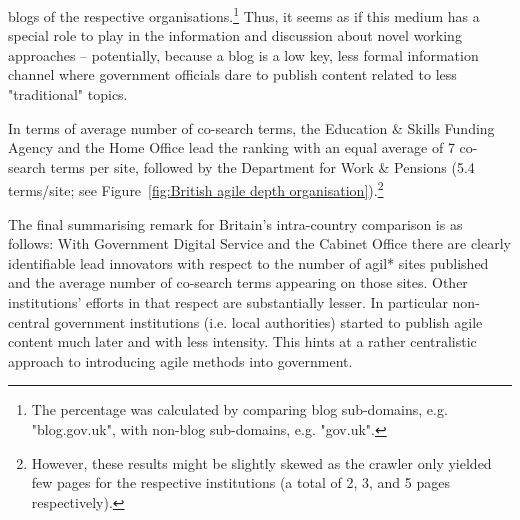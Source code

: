 \noindent blogs of the respective organisations.\footnote{The percentage was calculated by comparing blog sub-domains, e.g. "blog.gov.uk", with non-blog sub-domains, e.g. "gov.uk".} Thus, it seems as if this medium has a special role to play in the information and discussion about novel working approaches – potentially, because a blog is a low key, less formal information channel where government officials dare to publish content related to less "traditional" topics.

In terms of average number of co-search terms, the Education \& Skills Funding Agency and the Home Office lead the ranking with an equal average of 7 co-search terms per site, followed by the Department for Work \& Pensions (5.4 terms/site; see Figure~\ref{fig:British agile depth organisation}).\footnote{However, these results might be slightly skewed as the crawler only yielded few pages for the respective institutions (a total of 2, 3, and 5 pages respectively).} 

The final summarising remark for Britain's intra-country comparison is as follows: With Government Digital Service and the Cabinet Office there are clearly identifiable lead innovators with respect to the number of agil* sites published and the average number of co-search terms appearing on those sites. Other institutions' efforts in that respect are substantially lesser. In particular non-central government institutions (i.e. local authorities) started to publish agile content much later and with less intensity. This hints at a rather centralistic approach to introducing agile methods into government.

